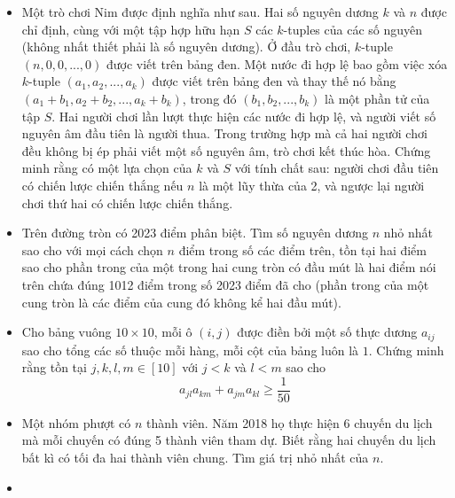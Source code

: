\documentclass[11pt]{scrartcl}
\begin{document}
\begin{itemize}[label=, leftmargin=0em, itemsep=-0em]
    \item \begin{btvn}
        Một trò chơi Nim được định nghĩa như sau. Hai số nguyên dương $k$ và $n$ được chỉ định, cùng với một tập hợp hữu hạn $S$ các $k$-tuples của các số nguyên (không nhất thiết phải là số nguyên dương). Ở đầu trò chơi, $k$-tuple $(n, 0, 0, ..., 0)$ được viết trên bảng đen.
        Một nước đi hợp lệ bao gồm việc xóa $k$-tuple $(a_1,a_2,...,a_k)$ được viết trên bảng đen và thay thế nó bằng $(a_1+b_1, a_2+b_2, ..., a_k+b_k)$, trong đó $(b_1, b_2, ..., b_k)$ là một phần tử của tập $S$. Hai người chơi lần lượt thực hiện các nước đi hợp lệ, và người viết số nguyên âm đầu tiên là người thua. Trong trường hợp mà cả hai người chơi đều không bị ép phải viết một số nguyên âm, trò chơi kết thúc hòa.
        Chứng minh rằng có một lựa chọn của $k$ và $S$ với tính chất sau: người chơi đầu tiên có chiến lược chiến thắng nếu $n$ là một lũy thừa của 2, và ngược lại người chơi thứ hai có chiến lược chiến thắng.
    \end{btvn}
    \item \begin{btvn}
        Trên đường tròn có 2023 điểm phân biệt. Tìm số nguyên dương $n$ nhỏ nhất sao cho với mọi cách chọn $n$ điểm trong số các điểm trên, tồn tại hai điểm sao cho phần trong của một trong hai cung tròn có đầu mút là hai điểm nói trên chứa đúng 1012 điểm trong số 2023 điểm đã cho (phần trong của một cung tròn là các điểm của cung đó không kể hai đầu mút).
    \end{btvn}
    \item \begin{btvn}
        Cho bảng vuông $10\times 10$, mỗi ô $(i,j)$ được điền bởi một số thực dương $a_{ij}$ sao cho tổng các số thuộc mỗi hàng, mỗi cột của bảng luôn là $1$. Chứng minh rằng tồn tại $j,k,l,m \in [10]$ với $j < k$ và $l < m$ sao cho
        \[
            a_{jl}a_{km} + a_{jm}a_{kl} \geq \frac{1}{50}
        \]
    \end{btvn}
    \item \begin{btvn}
        Một nhóm phượt có $n$ thành viên. Năm 2018 họ thực hiện 6 chuyến du lịch mà mỗi chuyến có đúng 5 thành viên tham dự. Biết rằng hai chuyến du lịch bất kì có tối đa hai thành viên chung. Tìm giá trị nhỏ nhất của $n$.
    \end{btvn}
    \item \begin{btvn}

\end{btvn}
\end{itemize}
\end{document}
